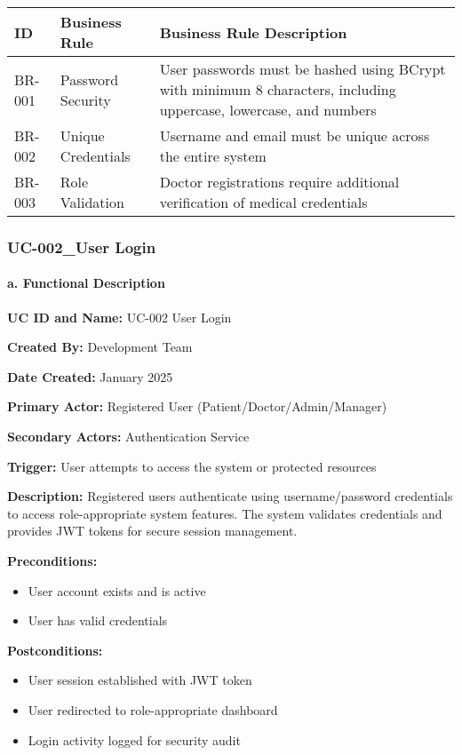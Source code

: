 \documentclass[12pt,a4paper]{article}
\begin{document}
\begin{longtable}{|p{2cm}|p{4cm}|p{8cm}|}
\hline
\textbf{ID} & \textbf{Business Rule} & \textbf{Business Rule Description} \\
\hline
BR-001 & Password Security & User passwords must be hashed using BCrypt with minimum 8 characters, including uppercase, lowercase, and numbers \\
\hline
BR-002 & Unique Credentials & Username and email must be unique across the entire system \\
\hline
BR-003 & Role Validation & Doctor registrations require additional verification of medical credentials \\
\hline
\end{longtable}

\subsubsection{UC-002\_User Login}

\paragraph{a. Functional Description}

\textbf{UC ID and Name:} UC-002 User Login

\textbf{Created By:} Development Team

\textbf{Date Created:} January 2025

\textbf{Primary Actor:} Registered User (Patient/Doctor/Admin/Manager)

\textbf{Secondary Actors:} Authentication Service

\textbf{Trigger:} User attempts to access the system or protected resources

\textbf{Description:} Registered users authenticate using username/password credentials to access role-appropriate system features. The system validates credentials and provides JWT tokens for secure session management.

\textbf{Preconditions:}
\begin{itemize}
    \item User account exists and is active
    \item User has valid credentials
\end{itemize}

\textbf{Postconditions:}
\begin{itemize}
    \item User session established with JWT token
    \item User redirected to role-appropriate dashboard
    \item Login activity logged for security audit
\end{itemize}
\end{document}
